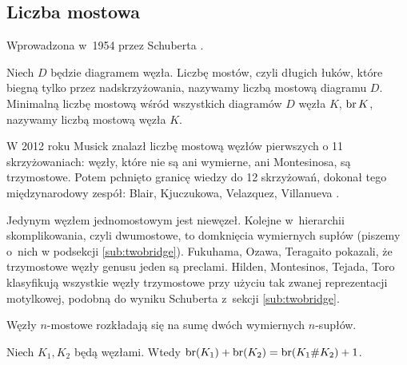 
\subsection{Liczba mostowa}
%

Wprowadzona w~1954 przez Schuberta \cite{schubert54}.
%

\begin{definition}
    Niech $D$ będzie diagramem węzła.
    Liczbę mostów, czyli długich łuków, które biegną tylko przez nadskrzyżowania, nazywamy liczbą mostową diagramu $D$.
    Minimalną liczbę mostową wśród wszystkich diagramów $D$ węzła $K$, $\operatorname{br} K$, nazywamy liczbą mostową węzła $K$.
\end{definition}

W 2012 roku Musick \cite{musick12} znalazł liczbę mostową węzłów pierwszych o 11 skrzyżowaniach: węzły, które nie są ani wymierne, ani Montesinosa, są trzymostowe.
%
Potem pchnięto granicę wiedzy do 12 skrzyżowań, dokonał tego międzynarodowy zespół: Blair, Kjuczukowa, Velazquez, Villanueva \cite{blair20}.
%
%
%
%

Jedynym węzłem jednomostowym jest niewęzeł.
Kolejne w~hierarchii skomplikowania, czyli dwumostowe, to domknięcia wymiernych supłów (piszemy o~nich w podsekcji \ref{sub:twobridge}).
Fukuhama, Ozawa, Teragaito \cite{fukuhama99} pokazali, że trzymostowe węzły genusu jeden są preclami.
%
%
%
%
%
%
Hilden, Montesinos, Tejada, Toro \cite{hilden12} klasyfikują wszystkie węzły trzymostowe przy użyciu tak zwanej reprezentacji motylkowej, podobną do wyniku Schuberta z~sekcji \ref{sub:twobridge}.
%
%
%
%
%
%
%

Węzły $n$-mostowe rozkładają się na sumę dwóch wymiernych $n$-supłów.
%

\begin{proposition}
\label{prp:bridge_additive}%
    Niech $K_1, K_2$ będą węzłami.
    Wtedy $\operatorname{br} (K_1) + \operatorname{br}(K_2) = \operatorname{br}(K_1 \# K_2) + 1$.
\end{proposition}

